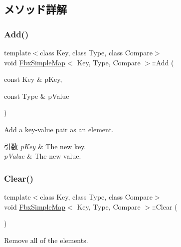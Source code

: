 \subsection{メソッド詳解}
\mbox{\label{class_fbx_simple_map_aff95473f35a67022ef78d6b81f72670b}} 
\subsubsection{\texorpdfstring{Add()}{Add()}}
{\footnotesize\ttfamily template$<$class Key, class Type, class Compare$>$ \\
void \hyperlink{class_fbx_simple_map}{Fbx\+Simple\+Map}$<$ Key, Type, Compare $>$\+::Add (\begin{DoxyParamCaption}\item[{const Key \&}]{p\+Key,  }\item[{const Type \&}]{p\+Value }\end{DoxyParamCaption})}

Add a key-\/value pair as an element. 
\begin{DoxyParams}{引数}
{\em p\+Key} & The new key. \\
\hline
{\em p\+Value} & The new value. \\
\hline
\end{DoxyParams}
\mbox{\label{class_fbx_simple_map_abd94eb8a48a52594555d6818515b1a06}} 
\subsubsection{\texorpdfstring{Clear()}{Clear()}}
{\footnotesize\ttfamily template$<$class Key, class Type, class Compare$>$ \\
void \hyperlink{class_fbx_simple_map}{Fbx\+Simple\+Map}$<$ Key, Type, Compare $>$\+::Clear (\begin{DoxyParamCaption}{ }\end{DoxyParamCaption})}



Remove all of the elements. 

\mbox{\label{class_fbx_simple_map_a83632d1ae605470b24d92ae8d6fc011f}} 
